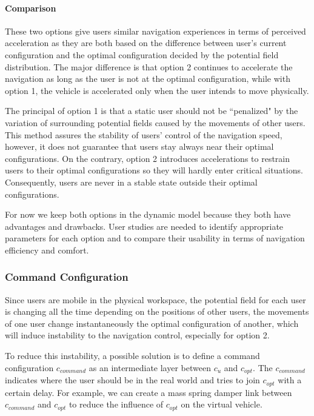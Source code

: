 \paragraph{Comparison}
These two options give users similar navigation experiences in terms of perceived acceleration as they are both based on the difference between user's current configuration and the optimal configuration decided by the potential field distribution. The major difference is that option 2 continues to accelerate the navigation as long as the user is not at the optimal configuration, while with option 1, the vehicle is accelerated only when the user intends to move physically.

The principal of option 1 is that a static user should not be ``penalized" by the variation of surrounding potential fields caused by the movements of other users. This method assures the stability of users' control of the navigation speed, however, it does not guarantee that users stay always near their optimal configurations. On the contrary, option 2 introduces accelerations to restrain users to their optimal configurations so they will hardly enter critical situations. Consequently, users are never in a stable state outside their optimal configurations.

For now we keep both options in the dynamic model because they both have advantages and drawbacks. User studies are needed to identify appropriate parameters for each option and to compare their usability in terms of navigation efficiency and comfort.

\subsubsection{Command Configuration}
\label{sec:command_config}
Since users are mobile in the physical workspace, the potential field for each user is changing all the time depending on the positions of other users, the movements of one user change instantaneously the optimal configuration of another, which will induce instability to the navigation control, especially for option 2.

To reduce this instability, a possible solution is to define a command configuration $c_{command}$ as an intermediate layer between $c_{u}$ and $c_{opt}$. The $c_{command}$ indicates where the user should be in the real world and tries to join $c_{opt}$ with a certain delay. For example, we can create a mass spring damper link between $c_{command}$ and $c_{opt}$ to reduce the influence of $c_{opt}$ on the virtual vehicle.

